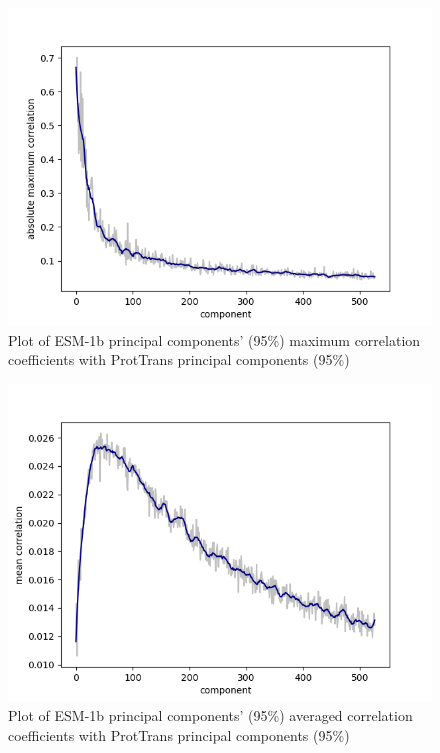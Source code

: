\documentclass[12pt]{article}
\begin{document}
	\begin{figure}[h!]
		\centering
		\includegraphics[scale=0.85]{validation_small_set_2_joined_PC_95_correlation_max.png}

		\caption{Plot of ESM-1b principal components' (95\%) maximum correlation 
		coefficients with ProtTrans principal components (95\%)}
		\label{figure:correlationComponentsMaxPC95}
	\end{figure}

	\newpage

	\begin{figure}[h!]
		\centering
		\includegraphics[scale=0.85]{validation_small_set_2_joined_PC_95_correlation_mean.png}

		\caption{Plot of ESM-1b principal components' (95\%) averaged correlation 
		coefficients with ProtTrans principal components (95\%)}
		\label{figure:correlationComponentsMeanPC95}
	\end{figure}
\end{document}
